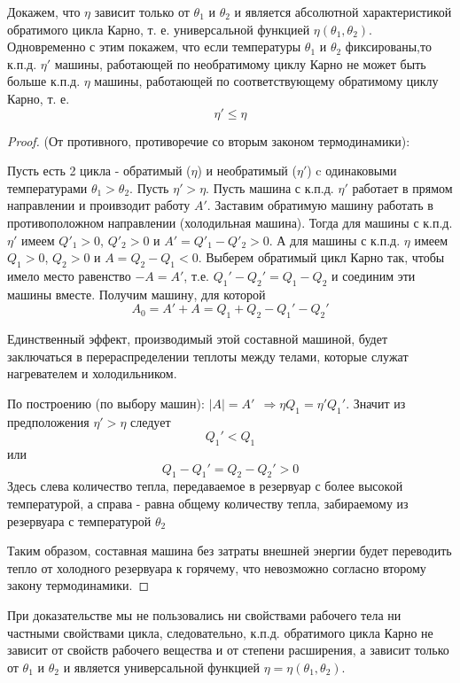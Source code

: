 Докажем, что $\eta$ зависит только от $\theta_1$ и $\theta_2$ и является абсолютной характеристикой обратимого цикла Карно, т. е. универсальной функцией $\eta(\theta_1, \theta_2)$. Одновременно с этим покажем,  что если температуры $\theta_1$ и $\theta_2$ фиксированы,то к.п.д. $\eta'$ машины, работающей по необратимому циклу Карно не может быть больше к.п.д. $\eta$ машины, работающей по соответствующему обратимому циклу Карно, т. е.
$$ \eta' \leq \eta $$
\begin{proof}
(От противного, противоречие со вторым законом термодинамики):

Пусть есть 2 цикла - обратимый ($\eta$) и необратимый ($\eta'$) c одинаковыми температурами $\theta_1 > \theta_2$. Пусть $\eta' > \eta$. Пусть машина с к.п.д. $\eta'$ работает в прямом направлении и проивзодит работу $A'$. Заставим обратимую машину работать в противоположном направлении (холодильная машина).  Тогда для машины с к.п.д. $\eta'$ имеем $Q'_1 > 0$, $Q'_2 > 0$ и $A' = Q'_1 - Q'_2 > 0$.  А для машины с к.п.д. $\eta$ имеем $Q_1 > 0$, $Q_2 > 0$ и $A = Q_2 - Q_1 < 0$. Выберем обратимый цикл Карно так, чтобы имело место равенство $-A = A'$, т.е. $Q_1' - Q_2' = Q_1 - Q_2$ и соединим эти машины вместе. Получим машину, для которой $$ A_0 = A' + A = Q_1 + Q_2 - Q_1' - Q_2' $$

Единственный эффект, производимый этой составной машиной, будет заключаться в перераспределении теплоты между телами,  которые служат нагревателем и холодильником.

По построению (по выбору машин): $|A| = A' \ \ \Rightarrow \eta Q_1 = \eta'Q_1' $. Значит из предположения $\eta' > \eta$ следует $$ Q_1' < Q_1 $$
или $$ Q_1 - Q_1' = Q_2 - Q_2' > 0 $$
Здесь слева количество тепла,  передаваемое в резервуар с более высокой температурой, а справа - равна общему количеству тепла, забираемому из резервуара с температурой $\theta_2$

Таким образом, составная машина без затраты внешней энергии будет переводить тепло от холодного резервуара к горячему, что невозможно согласно второму закону термодинамики.

\end{proof} 

При доказательстве мы не пользовались ни свойствами рабочего тела ни частными свойствами цикла, следовательно, к.п.д.  обратимого цикла Карно не зависит от свойств рабочего вещества и от степени расширения,  а зависит только от $\theta_1$ и $\theta_2$ и является универсальной функцией $\eta = \eta(\theta_1, \theta_2)$.

